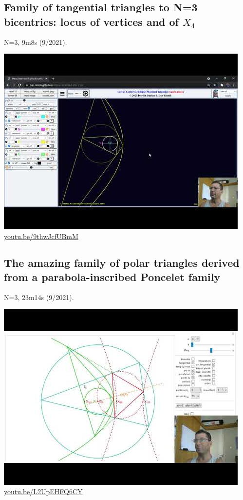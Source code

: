\documentclass[12pt]{amsart}
\begin{document}
\subsection{Family of tangential triangles to N=3 bicentrics: locus of vertices and of $X_{4}$}
\label{vid:9thwJcfUBmM}
\noindent N=3, 9m8s (9/2021). 
\begin{center}\includegraphics[width=.5\textwidth]{pics/9thwJcfUBmM.jpg} \\ 
\href{https://youtu.be/9thwJcfUBmM}{\url{youtu.be/9thwJcfUBmM}}\end{center}
% 

\subsection{The amazing family of polar triangles derived from a parabola-inscribed Poncelet family}
\label{vid:L2UpEHFQ6CY}
\noindent N=3, 23m14s (9/2021). 
\begin{center}\includegraphics[width=.5\textwidth]{pics/L2UpEHFQ6CY.jpg} \\ 
\href{https://youtu.be/L2UpEHFQ6CY}{\url{youtu.be/L2UpEHFQ6CY}}\end{center}
% 
\end{document}
